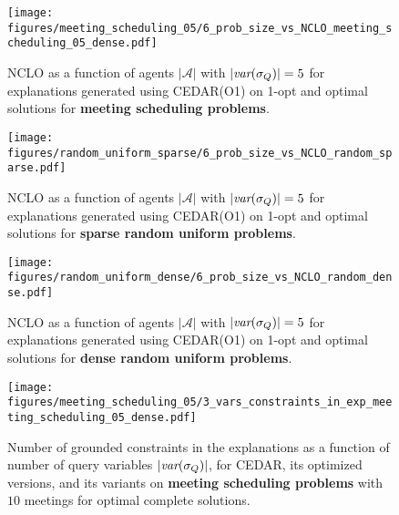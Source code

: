 \documentclass[twoside,11pt]{article}
\begin{document}

\begin{figure}[h]
\centering
\small
\texttt{[image: figures/meeting\_scheduling\_05/6\_prob\_size\_vs\_NCLO\_meeting\_scheduling\_05\_dense.pdf]} \\ 
\vspace{-0.5em} 
\caption{NCLO as a function of agents $|\mathcal{A}|$ with $|{\textit{var}(\sigma_Q)}| = 5$ for explanations generated using CEDAR(O1) on 1-opt and optimal solutions for \textbf{meeting scheduling problems}.}
\label{fig:6_results_NCLO_A_meeting}
\end{figure}

\begin{figure}[h]
\centering
\small
\texttt{[image: figures/random\_uniform\_sparse/6\_prob\_size\_vs\_NCLO\_random\_sparse.pdf]} \\ 
\vspace{-0.5em} 
\caption{NCLO as a function of agents $|\mathcal{A}|$ with $|{\textit{var}(\sigma_Q)}| = 5$ for explanations generated using CEDAR(O1) on 1-opt and optimal solutions for \textbf{sparse random uniform problems}.}
\label{fig:6_results_NCLO_A_sparse}
\end{figure}

\begin{figure}[h]
\centering
\small
\texttt{[image: figures/random\_uniform\_dense/6\_prob\_size\_vs\_NCLO\_random\_dense.pdf]} \\ 
\vspace{-0.5em} 
\caption{NCLO as a function of agents $|\mathcal{A}|$ with $|{\textit{var}(\sigma_Q)}| = 5$ for explanations generated using CEDAR(O1) on 1-opt and optimal solutions for \textbf{dense random uniform problems}.}
\label{fig:6_results_NCLO_A_dense}
\end{figure}








\begin{figure}[h]
\centering
\small
\texttt{[image: figures/meeting\_scheduling\_05/3\_vars\_constraints\_in\_exp\_meeting\_scheduling\_05\_dense.pdf]} \\ 
\vspace{-0.5em} 
\caption{Number of grounded constraints in the explanations as a function of number of query variables $|{\textit{var}(\sigma_Q)}|$, for CEDAR, its optimized versions, and its variants on \textbf{meeting scheduling problems} with $10$ meetings for optimal complete solutions.}
\label{fig:3_results_num_constraints_Q_meeting}
\end{figure}
\end{document}
